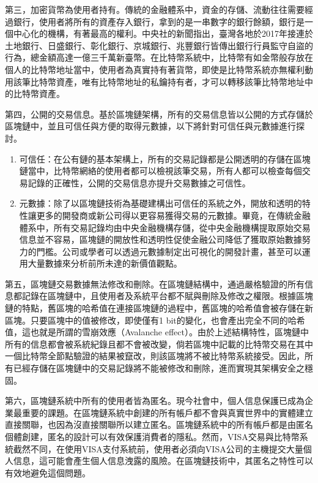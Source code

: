 				第三，加密貨幣為使用者持有。傳統的金融體系中，資金的存儲、流動往往需要經過銀行，使用者將所有的資產存入銀行，拿到的是一串數字的銀行餘額，銀行是一個中心化的機構，有著最高的權利。中央社的新聞\supercite{Bankguardsstolen}指出，臺灣各地於2017年接連於土地銀行、日盛銀行、彰化銀行、京城銀行、兆豐銀行皆傳出銀行行員監守自盜的行為，總金額高達一億三千萬新臺幣。在比特幣系統中，比特幣有如金幣般存放在個人的比特幣地址當中，使用者為真實持有著貨幣，即使是比特幣系統亦無權利動用該筆比特幣資產，唯有比特幣地址的私鑰持有者，才可以轉移該筆比特幣地址中的比特幣資產。

				第四，公開的交易信息。基於區塊鏈架構，所有的交易信息皆以公開的方式存儲於區塊鏈中，並且可信任與方便的取得元數據，以下將針對可信任與元數據進行探討。
				\begin{enumerate}
					\item 可信任：在公有鏈的基本架構上，所有的交易記錄都是公開透明的存儲在區塊鏈當中，比特幣網絡的使用者都可以檢視該筆交易，所有人都可以檢查每個交易記錄的正確性，公開的交易信息亦提升交易數據之可信性。
					\item 元數據：除了以區塊鏈技術為基礎建構出可信任的系統之外，開放和透明的特性讓更多的開發商或新公司得以更容易獲得交易的元數據。畢竟，在傳統金融體系中，所有交易記錄均由中央金融機構存儲，從中央金融機構提取原始交易信息並不容易，區塊鏈的開放性和透明性促使金融公司降低了獲取原始數據努力的門檻。公司或學者可以透過元數據制定出可視化的開發計畫，甚至可以運用大量數據來分析前所未達的新價值觀點。
				\end{enumerate}

				第五，區塊鏈交易數據無法修改和刪除。在區塊鏈結構中，通過嚴格驗證的所有信息都記錄在區塊鏈中，且使用者及系統平台都不賦與刪除及修改之權限。根據區塊鏈的特點，舊區塊的哈希值在連接區塊鏈的過程中，舊區塊的哈希值會被存儲在新區塊。只要區塊中的值被修改，即使僅有1 bit的變化，也會產出完全不同的哈希值，這也就是所謂的雪崩效應（Avalanche effect）\supercite{Theuseofbentsequencestoachievehigher-orderstrictavalanchecriterioninS-boxdesign}。由於上述結構特性，區塊鏈中所有的信息都會被系統紀錄且都不會被改變，倘若區塊中記載的比特幣交易在其中一個比特幣全節點驗證的結果被竄改，則該區塊將不被比特幣系統接受。因此，所有已經存儲在區塊鏈中的交易記錄將不能被修改和刪除，進而實現其架構安全之穩固。

				第六，區塊鏈系統中所有的使用者皆為匿名。現今社會中，個人信息保護已成為企業最重要的課題。在區塊鏈系統中創建的所有帳戶都不會與真實世界中的實體建立直接關聯，也因為沒直接關聯所以建立匿名。區塊鏈系統中的所有帳戶都是由匿名個體創建，匿名的設計可以有效保護消費者的隱私。然而，VISA交易與比特幣系統截然不同，在使用VISA支付系統前，使用者必須向VISA公司的主機提交大量個人信息，這可能會產生個人信息洩露的風險。在區塊鏈技術中，其匿名之特性可以有效地避免這個問題。

